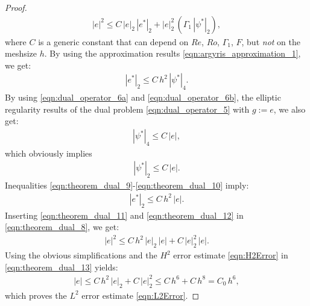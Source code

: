 \begin{proof}
\begin{eqnarray}
|e|^2
\leq C \, | e |_2 \, |e^* |_2
+ | e |_2^2 \,
\left(
\Gamma_1 \, | \psi^* |_2
\right) ,
\label{eqn:theorem_dual_8}
\end{eqnarray}
where $C$ is a generic constant that can depend on $Re$, $Ro$, $\Gamma_1$, $F$, but \emph{not} on the meshsize $h$.
By using the approximation results \eqref{eqn:argyris_approximation_1}, we get:
\begin{eqnarray}
|e^* |_2
\leq C \, h^2 \, | \psi^* |_4 .
\label{eqn:theorem_dual_9}
\end{eqnarray}
By using \eqref{eqn:dual_operator_6a} and \eqref{eqn:dual_operator_6b}, the elliptic regularity results of the dual problem \eqref{eqn:dual_operator_5} with $g := e$, we also get:
\begin{eqnarray}
| \psi^* |_4
\leq C \, | e | ,
\label{eqn:theorem_dual_10}
\end{eqnarray}
which obviously implies
\begin{eqnarray}
| \psi^* |_2
\leq C \, | e | .
\label{eqn:theorem_dual_11}
\end{eqnarray}
Inequalities \eqref{eqn:theorem_dual_9}-\eqref{eqn:theorem_dual_10} imply:
\begin{eqnarray}
|e^* |_2
\leq C \, h^2 \, | e | .
\label{eqn:theorem_dual_12}
\end{eqnarray}
Inserting \eqref{eqn:theorem_dual_11} and \eqref{eqn:theorem_dual_12}  in \eqref{eqn:theorem_dual_8}, we get:
\begin{eqnarray}
|e|^2
\leq C \, h^2 \, | e |_2 \, | e |
+ C \, | e |_2^2 \, | e | .
\label{eqn:theorem_dual_13}
\end{eqnarray}
Using the obvious simplifications and the $H^2$ error estimate \eqref{eqn:H2Error} in \eqref{eqn:theorem_dual_13} yields:
\begin{eqnarray}
|e|
\leq C \, h^2 \, | e |_2
+ C \, | e |_2^2
\leq C \, h^6 + C \, h^8
= C_0 \, h^6 ,
\label{eqn:theorem_dual_14}
\end{eqnarray}
which proves the $L^2$ error estimate \eqref{eqn:L2Error}.



\end{proof}
